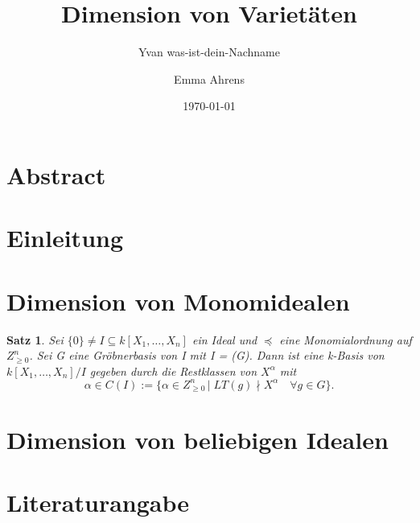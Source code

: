 \documentclass{article}
\title{Dimension von Varietäten}
\date{\today}
\author{Yvan was-ist-dein-Nachname \and Emma Ahrens}
\newtheorem{satz}{Satz}
\begin{document}
\maketitle
\tableofcontents

\section{Abstract}
\section{Einleitung}
\section{Dimension von Monomidealen}

	\begin{satz}
	Sei \(\{0\} \neq I \subseteq k[X_{1},\ldots,X_{n}]\) ein Ideal und \(\preceq\) eine Monomialordnung auf \(Z^{n}_{\geq 0}\). Sei G eine Gröbnerbasis von I mit I = (G). Dann ist eine k-Basis von \(k[X_{1},\ldots,X_{n}]/I\) gegeben durch die Restklassen von \(X^{\alpha}\) mit
	\begin{displaymath}
	\alpha \in C(I) := \{\alpha \in Z^{n}_{\geq 0}\, |\; LT(g) \nmid X^{\alpha}\quad \forall g \in G\}.
	\end{displaymath}
	\end{satz}
	

\section{Dimension von beliebigen Idealen}
\section{Literaturangabe}
\end{document}
